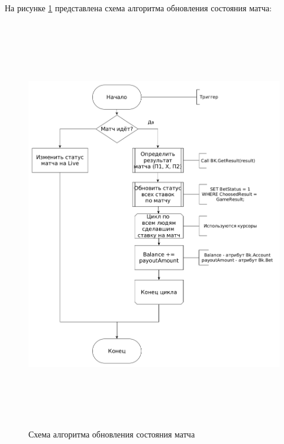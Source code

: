 На рисунке \ref{fig::update} представлена схема алгоритма обновления состояния матча:
\FloatBarrier
\begin{figure}[hp]	
	\begin{center}
		\includegraphics[height=18cm, width=\linewidth]{inc/updateFlow.png}
	\end{center}
	\caption{Схема алгоритма обновления состояния матча}
	\label{fig::update}
\end{figure}
\FloatBarrier
